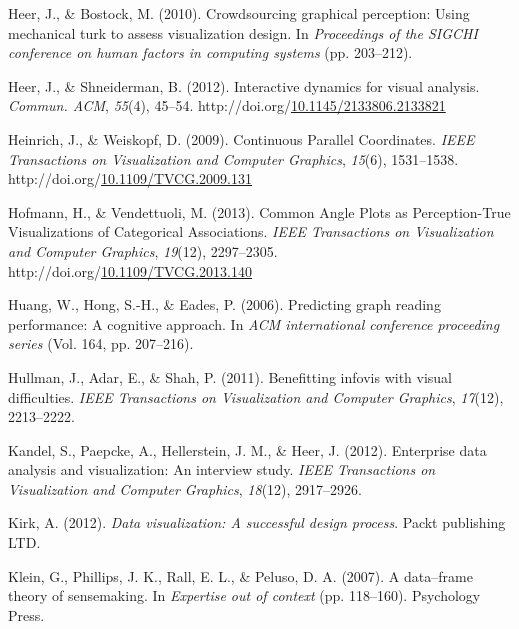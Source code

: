 \documentclass[print]{nuthesis}
\newlength{\cslhangindent}
\newenvironment{CSLReferences}[2]%
{\setlength{\parindent}{0pt}%
\everypar{\setlength{\hangindent}{\cslhangindent}}\ignorespaces}%
{\par}
\begin{document}
\begin{CSLReferences}{1}{0}
\leavevmode{}%
Heer, J., \& Bostock, M. (2010). Crowdsourcing graphical perception: Using mechanical turk to assess visualization design. In \emph{Proceedings of the SIGCHI conference on human factors in computing systems} (pp. 203--212).

\leavevmode{}%
Heer, J., \& Shneiderman, B. (2012). Interactive dynamics for visual analysis. \emph{Commun. ACM}, \emph{55}(4), 45--54. http://doi.org/\href{https://doi.org/10.1145/2133806.2133821}{10.1145/2133806.2133821}

\leavevmode{}%
Heinrich, J., \& Weiskopf, D. (2009). {Continuous Parallel Coordinates}. \emph{IEEE Transactions on Visualization and Computer Graphics}, \emph{15}(6), 1531--1538. http://doi.org/\href{https://doi.org/10.1109/TVCG.2009.131}{10.1109/TVCG.2009.131}

\leavevmode{}%
Hofmann, H., \& Vendettuoli, M. (2013). {Common Angle Plots as Perception-True Visualizations of Categorical Associations}. \emph{IEEE Transactions on Visualization and Computer Graphics}, \emph{19}(12), 2297--2305. http://doi.org/\href{https://doi.org/10.1109/TVCG.2013.140}{10.1109/TVCG.2013.140}

\leavevmode{}%
Huang, W., Hong, S.-H., \& Eades, P. (2006). Predicting graph reading performance: A cognitive approach. In \emph{ACM international conference proceeding series} (Vol. 164, pp. 207--216).

\leavevmode{}%
Hullman, J., Adar, E., \& Shah, P. (2011). Benefitting infovis with visual difficulties. \emph{IEEE Transactions on Visualization and Computer Graphics}, \emph{17}(12), 2213--2222.

\leavevmode{}%
Kandel, S., Paepcke, A., Hellerstein, J. M., \& Heer, J. (2012). Enterprise data analysis and visualization: An interview study. \emph{IEEE Transactions on Visualization and Computer Graphics}, \emph{18}(12), 2917--2926.

\leavevmode{}%
Kirk, A. (2012). \emph{Data visualization: A successful design process}. Packt publishing LTD.

\leavevmode{}%
Klein, G., Phillips, J. K., Rall, E. L., \& Peluso, D. A. (2007). A data--frame theory of sensemaking. In \emph{Expertise out of context} (pp. 118--160). Psychology Press.


\end{CSLReferences}
\end{document}
